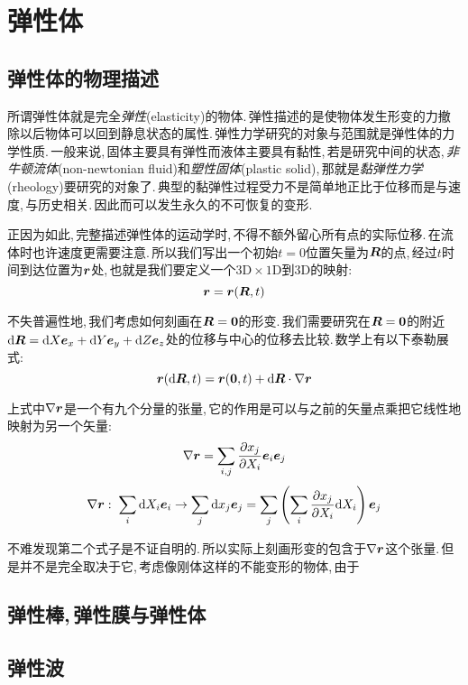 \chapter{弹性体}


\section{弹性体的物理描述}

所谓弹性体就是完全\emph{弹性}(elasticity)的物体.\,弹性描述的是使物体发生形变的力撤除以后物体可以回到静息状态的属性.\,弹性力学研究的对象与范围就是弹性体的力学性质.\,一般来说,\,固体主要具有弹性而液体主要具有黏性,\,若是研究中间的状态,\,\emph{非牛顿流体}(non-newtonian fluid)和\emph{塑性固体}(plastic solid),\,那就是\emph{黏弹性力学}(rheology)要研究的对象了.\,典型的黏弹性过程受力不是简单地正比于位移而是与速度,\,与历史相关.\,因此而可以发生永久的不可恢复的变形.

正因为如此,\,完整描述弹性体的运动学时,\,不得不额外留心所有点的实际位移.\,在流体时也许速度更需要注意.\,所以我们写出一个初始$t=0$位置矢量为$\boldsymbol{R}$的点,\,经过$t$时间到达位置为$\boldsymbol{r}$处,\,也就是我们要定义一个$\mathrm{3D}\times\mathrm{1D}$到$\mathrm{3D}$的映射:
\[\boldsymbol{r}=\boldsymbol{r}(\boldsymbol{R},t)\]

不失普遍性地,\,我们考虑如何刻画在$\boldsymbol{R}=\boldsymbol{0}$的形变.\,我们需要研究在$\boldsymbol{R}=\boldsymbol{0}$的附近$\textrm{d} \boldsymbol{R}=\textrm{d} X\boldsymbol{e}_x+\textrm{d} Y\boldsymbol{e}_y+\textrm{d} Z\boldsymbol{e}_z$处的位移与中心的位移去比较.\,数学上有以下泰勒展式:
\[\boldsymbol{r}(\textrm{d} \boldsymbol{R},t)=\boldsymbol{r}(\boldsymbol{0},t)+\textrm{d} \boldsymbol{R}\cdot \nabla \boldsymbol{r}\]

上式中$\nabla\boldsymbol{r}$是一个有九个分量的张量,\,它的作用是可以与之前的矢量点乘把它线性地映射为另一个矢量:
\[\nabla\boldsymbol{r}=\sum_{i,j}\frac{\partial x_j}{\partial X_i}\boldsymbol{e}_i\boldsymbol{e}_j\]
\[\nabla\boldsymbol{r}:\; \sum_i\textrm{d} X_i\boldsymbol{e}_i\rightarrow \sum_j\textrm{d} x_j\boldsymbol{e}_j=\sum_j\left(\sum_i \frac{\partial x_j}{\partial X_i}\textrm{d} X_i\right)\boldsymbol{e}_j\]

不难发现第二个式子是不证自明的.\,所以实际上刻画形变的包含于$\nabla\boldsymbol{r}$这个张量.\,但是并不是完全取决于它,\,考虑像刚体这样的不能变形的物体,\,由于


\section{弹性棒,\,弹性膜与弹性体}

\section{弹性波}

